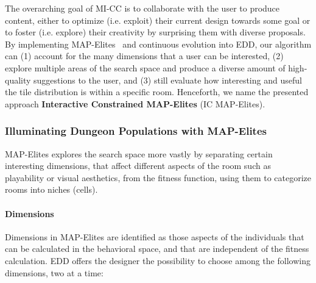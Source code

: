 The overarching goal of MI-CC is to collaborate with the user to produce content, either to optimize (i.e. exploit) their current design towards some goal or to foster (i.e. explore) their creativity by surprising them with diverse proposals. By implementing MAP-Elites~ and continuous evolution into EDD, our algorithm can (1) account for the many dimensions that a user can be interested, (2) explore multiple areas of the search space and produce a diverse amount of high-quality suggestions to the user, and (3) still evaluate how interesting and useful the tile distribution is within a specific room. Henceforth, we name the presented approach \textbf{Interactive Constrained MAP-Elites} (IC MAP-Elites). 

\subsubsection{Illuminating Dungeon Populations with MAP-Elites}

MAP-Elites explores the search space more vastly by separating certain interesting dimensions, that affect different aspects of the room such as playability or visual aesthetics, from the fitness function, using them to categorize rooms into niches (cells). %

\paragraph{Dimensions}

Dimensions in MAP-Elites are identified as those aspects of the individuals that can be calculated in the behavioral space, and that are independent of the fitness calculation. %
EDD offers the designer the possibility to choose among the following dimensions, two at a time:

